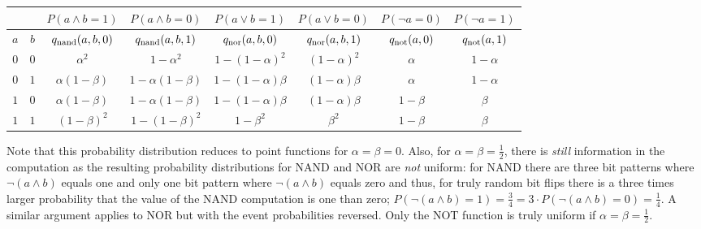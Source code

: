 \begin{center}
    \begin{tabular}{c|c||c|c||c|c||c|c}
        \multicolumn{2}{c||}{}         &
        $P\left(a \land b = 1\right)$  & $P\left(a \land b = 0\right)$  &
        $P\left(a \lor b = 1\right)$   & $P\left(a \lor b = 0\right)$   &
        $P\left(\neg a = 0\right)$     & $P\left(\neg a = 1\right)$       \\
        \hline
        $a$                            & $b$                            &
        $q_{\mathrm{nand}}(a,b,0)$               & $q_{\mathrm{nand}}(a,b,1)$               &
        $q_{\mathrm{nor}}(a,b,0) $               & $q_{\mathrm{nor}}(a,b,1)$                &
        $q_{\mathrm{not}}(a,0)$                  & $q_{\mathrm{not}}(a,1)$                    \\
        \hline
        $0$                            & $0$                            &
        $\alpha^2$                     & $1-\alpha^2$                   &
        $1-\left(1-\alpha\right)^2$    & $\left(1-\alpha\right)^2$      &
        $\alpha$                       & $1-\alpha$                       \\
        $0$                            & $1$                            &
        $\alpha\left(1-\beta\right)$   & $1-\alpha\left(1-\beta\right)$ &
        $1-\left(1-\alpha\right)\beta$ & $\left(1-\alpha\right)\beta$   &
        $\alpha$                       & $1-\alpha$                       \\
        $1$                            & $0$                            &
        $\alpha\left(1-\beta\right)$   & $1-\alpha\left(1-\beta\right)$ &
        $1-\left(1-\alpha\right)\beta$ & $\left(1-\alpha\right)\beta$   &
        $1-\beta$                      & $\beta$                          \\
        $1$                            & $1$                            &
        $\left(1-\beta\right)^2$       & $1-\left(1-\beta\right)^2$     &
        $1-\beta^2$                    & $\beta^2$                      &
        $1-\beta$                      & $\beta$                          \\
    \end{tabular}
\end{center}

Note that this probability distribution reduces to point functions for $\alpha = \beta = 0$. Also, for $\alpha = \beta = \frac{1}{2}$, there is {\em still} information in the computation as the resulting probability distributions for NAND and NOR are {\em not} uniform: for NAND there are three bit patterns where $\neg(a \land b)$ equals one and only one bit pattern where $\neg(a \land b)$ equals zero and thus, for truly random bit flips there is a three times larger probability that the value of the NAND computation is one than zero; $P(\neg(a \land b) = 1)=\frac{3}{4}=3\cdot P(\neg(a \land b) = 0)=\frac{1}{4}$. A similar argument applies to NOR but with the event probabilities reversed. Only the NOT function is truly uniform if $\alpha = \beta = \frac{1}{2}$.

